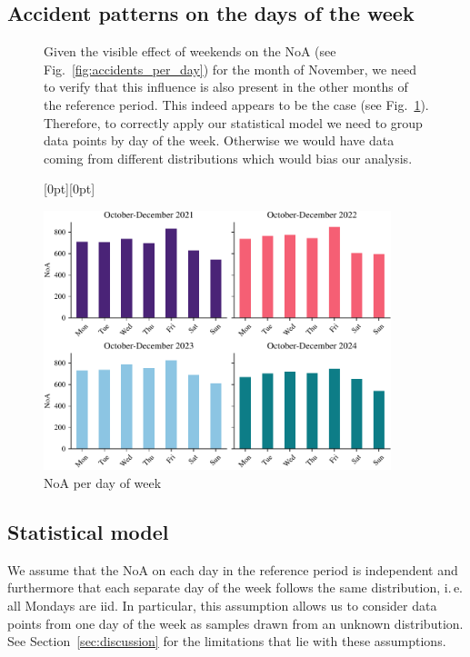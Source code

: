 \documentclass{article}
\begin{document}
\subsection{Accident patterns on the days of the week}\label{sec:noa_day_of_week}
\begin{figure}[H]
  \begin{minipage}{0.4\textwidth}
    Given the visible effect of weekends on the NoA (see
    Fig.~\ref{fig:accidents_per_day}) for the month of November, we need to
    verify that this influence is also present in the other months of the reference
    period. This indeed appears to be the case (see
    Fig.~\ref{fig:accidents_per_day_of_week}). Therefore, to correctly apply our
    statistical model we need to group data points by day of the week. Otherwise we
    would have data coming from different distributions which would bias our
    analysis.
  \end{minipage}
  \hspace{0.02\textwidth}
  \raisebox{-.7cm}[0pt][0pt]{
    \begin{minipage}{0.6\textwidth}
      \includegraphics[width=0.9\textwidth]{../fig/accidents_per_day_of_week.pdf}
      \caption{NoA per day of week}\label{fig:accidents_per_day_of_week}
    \end{minipage}
  }
\end{figure}

\vspace{1cm}

\subsection{Statistical model}
We assume that the NoA on each day in the reference period is independent and
furthermore that each separate day of the week follows the same distribution,
i.\,e.\xspace all Mondays are iid. In particular, this assumption allows us to
consider data points from one day of the week as samples drawn from an unknown
distribution. See Section~\ref{sec:discussion} for the limitations that lie with
these assumptions.
\end{document}

